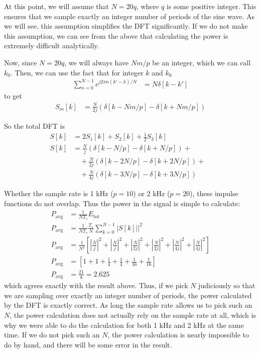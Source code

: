 \documentclass[twocolumn]{myarticle}
\begin{document}
At this point, we will assume that $ N = 20 q $, where $ q $ is some positive integer.
This ensures that we sample exactly an integer number of periods of the sine wave.
As we will see, this assumption simplifies the DFT significantly.
If we do not make this assumption, we can see from the above that calculating the power is extremely difficult analytically.

Now, since $ N = 20 q $, we will always have $ N m /p $ be an integer, which we can call $ k_0 $.
Then, we can use the fact that for integer $ k $ and $ k_0 $
\begin{align}
    \sum_{n = 0}^{N-1} e^{j 2 \pi n (k'-k)/N} &= N \delta[k-k']
\end{align}
to get
\begin{align}
    S_m[k] &= \frac{N}{2j} \left( \delta[k - Nm/p] - \delta[k + Nm/p] \right)
\end{align}

So the total DFT is
\begin{align}
    S[k] &= 2 S_1[k] + S_2[k] + \frac{1}{2} S_3[k]
    \\
    S[k] &= \frac{N}{j} \left( \delta[k - N/p] - \delta[k + N/p] \right) + &
    \nonumber \\
    & \quad + \frac{N}{2j} \left( \delta[k - 2N/p] - \delta[k + 2N/p] \right) + & 
    \nonumber \\
    & \quad + \frac{N}{4j} \left( \delta[k - 3N/p] - \delta[k + 3N/p] \right)
\end{align}

Whether the sample rate is 1 kHz ($ p = 10 $) or 2 kHz ($ p = 20 $), these impulse functions do not overlap.
Thus the power in the signal is simple to calculate:
\begin{align}
    P_\text{avg} &= \frac{1}{N T_s} E_\text{tot}
    \\
    P_\text{avg} &= \frac{1}{N T_s} \frac{T_s}{N} \sum_{k = 0}^{N-1} \left|S[k]|\right|^2
    \\
    P_\text{avg} &= \frac{1}{N^2} \left[ \left| \frac{N}{j} \right|^2 + \left| \frac{N}{j} \right|^2 + \left| \frac{N}{2j} \right|^2 + \left| \frac{N}{2j} \right|^2 + \left| \frac{N}{4j} \right|^2 + \left| \frac{N}{4j} \right|^2 \right]
    \\
    P_\text{avg} &= \left[ 1 + 1 + \frac{1}{4} + \frac{1}{4} + \frac{1}{16} + \frac{1}{16} \right]
    \\
    P_\text{avg} &= \frac{21}{8} = 2.625
\end{align}
which agrees exactly with the result above.
Thus, if we pick $ N $ judiciously so that we are sampling over exactly an integer number of periods, the power calculated by the DFT is exactly correct.
As long the sample rate allows us to pick such an $ N $, the power calculation does not actually rely on the sample rate at all, which is why we were able to do the calculation for both 1 kHz and 2 kHz at the same time.
If we do not pick such an $ N $, the power calculation is nearly impossible to do by hand, and there will be some error in the result.
\end{document}
